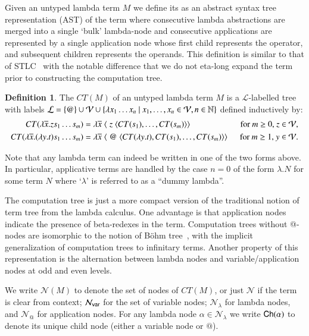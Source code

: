 \documentclass{elsarticle}
\makeatletter
\theoremstyle{plain}
\theoremstyle{definition}
\newtheorem{definition}{Definition}[section]
\theoremstyle{remark}
\newcommand\VarSet{\mathcal{V}}
\newcommand\Nodes{\mathcal{N}}%
\newcommand\NodesVar{\Nodes_{\sf var}}%
\newcommand\NodesLmd{\Nodes_\lambda}%
\newcommand\NodesApp{\Nodes_@}%
\newcommand{\child}{{\small \sf Ch}} %
\newcommand{\ctree}{CT} %
\makeatother
\begin{document}
Given an untyped lambda term $M$ we define its  as an abstract syntax tree representation
(AST) of the term where consecutive lambda abstractions are merged into a single `bulk' lambda-node and consecutive applications are represented by a single application node whose first child represents the operator, and subsequent children represents the operands.
This definition is similar to that of STLC~\cite{OngLics2006, BlumPhd} with the notable difference that we do not eta-long expand the term prior to constructing the computation tree.
\begin{definition}
The  $\ctree(M)$ of an
 untyped lambda term $M$ is a $\mathcal{L}$-labelled tree
with labels
$\mathcal{L} = \{ @ \} \union \VarSet \union \{ \lambda x_1 \ldots x_n \ | \ x_1 ,\ldots, x_n \in
    \VarSet, n\in\nat \}$
defined inductively by:
\begin{align*}
    \ctree(\lambda \overline{x} . z s_1 \ldots s_m) &= \lambda \overline{x}\; \langle\; z\; \langle \ctree(s_1),\ldots,\ctree(s_m)\rangle\rangle
&    \hbox{for $m\geq 0$, $z \in \VarSet$},
\\
\ctree(\lambda \overline{x} . (\lambda y.t) s_1 \ldots s_m) &= \lambda \overline{x}\; \langle\; @ \; \langle \ctree(\lambda y.t),\ctree(s_1),\ldots,\ctree(s_m) \rangle \rangle \enspace
&  \hbox{for $m\geq 1$, $y\in \VarSet$}.
\end{align*}

Note that any lambda term can indeed be written in one of the two forms above. In particular, applicative terms are handled by the case $n=0$ of the form $\lambda . N$ for some term $N$ where `$\lambda$' is referred to as a ``dummy lambda''.

The computation tree is just a more compact version of the traditional notion of term tree from the lambda calculus. One advantage is that application nodes indicate the presence of beta-redexes in the term. Computation trees without @-nodes are isomorphic to the notion of B\"ohm tree~\cite{Barendregt84}, with the implicit generalization of computation trees to infinitary terms.
Another property of this representation is the alternation between lambda nodes and variable/application nodes at odd and even levels.

We write $\Nodes(M)$ to denote the set of nodes of $\ctree(M)$, or just $\Nodes$ if the term is clear from context; $\NodesVar$ for the set of variable nodes; $\NodesLmd$ for lambda nodes, and $\NodesApp$ for  application nodes. For any lambda node $\alpha\in\NodesLmd$ we write $\child(\alpha)$ to denote its unique child node (either a variable node or $@$).
\end{definition}
\end{document}
